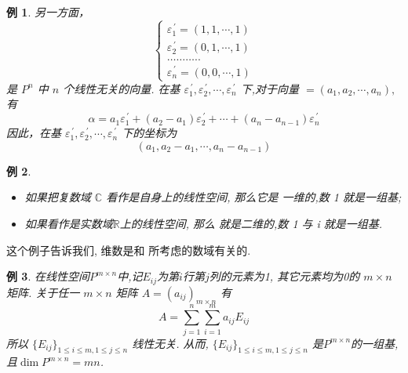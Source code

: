 \documentclass[13pt]{beamer}
\newtheorem{exa}{例}
\def\dim{\operatorname{dim}}
\begin{document}
\begin{frame}
\addtocounter{exa}{-1}
\begin{exa}
另一方面，
\[
\left\{\begin{array}{l}
{\varepsilon}_{1}^{\, \prime}=(1,1, \cdots, 1) \\
{\varepsilon}_{2}^{\, \prime}=(0,1, \cdots, 1) \\
\ldots \ldots \ldots . . \\
{\varepsilon}_{n}^{\, \prime}=(0,0, \cdots, 1)
\end{array}\right.
\]
是 $P^{n}$ 中 $n$ 个线性无关的向量. 
在基 ${\varepsilon}_{1}^{\, \prime}, {\varepsilon}_{2}^{\, \prime}, \cdots, {\varepsilon}_{n}^{\, \prime}$ 下,对于向量
$=\left(a_{1}, a_{2}, \cdots, a_{n}\right),$ 有
\[
{\alpha}=a_{1} {\varepsilon}_{1}^{\, \prime}+\left(a_{2}-a_{1}\right) {\varepsilon}_{2}^{\, \prime}+\cdots+\left(a_{n}-a_{n-1}\right) {\varepsilon}_{n}^{\, \prime}
\]
因此，在基 ${\varepsilon}_{1}^{\, \prime}, {\varepsilon}_{2}^{\, \prime}, \cdots, {\varepsilon}_{n}^{\, \prime}$ 下的坐标为
\[
\left(a_{1}, a_{2}-a_{1}, \cdots, a_{n}-a_{n-1}\right)
\]
\end{exa}
\end{frame}


\begin{frame}
\begin{exa}
\begin{itemize}
\item 如果把复数域 $\mathbb{C}$ 看作是自身上的线性空间, 那么它是 一维的,数 1 就是一组基;
\item 如果看作是实数域$\mathbb{R}$上的线性空间, 那么 就是二维的,数 1 与 i 就是一组基.
\end{itemize}
\end{exa}
这个例子告诉我们, 维数是和 所考虑的数域有关的. 
\end{frame}

\begin{frame}
\begin{exa}
在线性空间$P^{m \times n}$中,记$E_{ij}$为第$i$行第$j$列的元素为1, 其它元素均为0的
$m \times n$矩阵.
关于任一 $m \times n$ 矩阵 $A=\left( a_{i j} \right)_{m \times n}$ 有
\[
A=\sum_{j=1}^{n} \sum_{i=1}^{m} a_{i j} E_{i j}
\]
所以 $\{ E_{i j} \}_{1\le i \le m, 1 \le j \le n}$ 线性无关.
从而, $\{ E_{i j} \}_{1\le i \le m, 1 \le j \le n}$  是$P^{m\times n}$的一组基, 
且$\dim P^{m\times n} = m n$.
\end{exa}
\end{frame}
\end{document}
